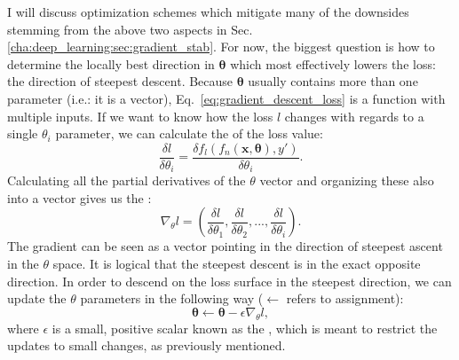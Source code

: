 			I will discuss optimization schemes which mitigate many of the downsides stemming from the above two aspects in Sec.~ \ref{cha:deep_learning:sec:gradient_stab}.
			For now, the biggest question is how to determine the locally best direction in $\mathbf{\theta}$ which most effectively lowers the loss: the direction of steepest descent.
			Because $\mathbf{\theta}$ usually contains more than one parameter (i.e.: it is a vector), Eq.~\ref{eq:gradient_descent_loss} is a function with multiple inputs.
			If we want to know how the loss $l$ changes with regards to a single $\theta_i$ parameter, we can calculate the  of the loss value:
			\begin{equation}
				\frac{\delta{l}}{\delta\theta_i} = \frac{\delta{f_l(f_n(\mathbf{x}, \mathbf{\theta}), y')}}{\delta\theta_i}.
			\end{equation}
			\noindent Calculating all the partial derivatives of the $\theta$ vector and organizing these also into a vector gives us the :
			\begin{equation}
				\nabla_{\theta}l = (\frac{\delta{l}}{\delta\theta_1}, \frac{\delta{l}}{\delta\theta_2}, ..., \frac{\delta{l}}{\delta\theta_i}).	
			\end{equation}
			\noindent The gradient can be seen as a vector pointing in the direction of steepest ascent in the $\theta$ space.
			It is logical that the steepest descent is in the exact opposite direction.
			In order to descend on the loss surface in the steepest direction, we can update the $\theta$ parameters in the following way ($\leftarrow$ refers to assignment):
			\begin{equation}
				\label{eq:gradient_descent}
				\mathbf{\theta} \leftarrow \mathbf{\theta} - \epsilon\nabla_{\theta}l,
			\end{equation}
			\noindent where $\epsilon$ is a small, positive scalar known as the , which is meant to restrict the updates to small changes, as previously mentioned.
			
